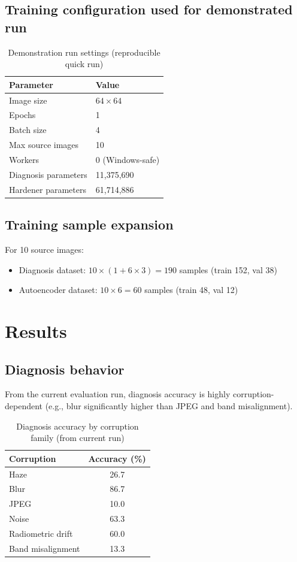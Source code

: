 \documentclass[11pt]{article}
\begin{document}
\subsection{Training configuration used for demonstrated run}
\begin{table}[H]
\centering
\caption{Demonstration run settings (reproducible quick run)}
\begin{tabular}{ll}
\toprule
Parameter & Value \\
\midrule
Image size & $64 \times 64$ \\
Epochs & 1 \\
Batch size & 4 \\
Max source images & 10 \\
Workers & 0 (Windows-safe) \\
Diagnosis parameters & 11,375,690 \\
Hardener parameters & 61,714,886 \\
\bottomrule
\end{tabular}
\label{tab:setup}
\end{table}

\subsection{Training sample expansion}
For 10 source images:
\begin{itemize}
\item Diagnosis dataset: $10 \times (1 + 6\times3) = 190$ samples (train 152, val 38)
\item Autoencoder dataset: $10 \times 6 = 60$ samples (train 48, val 12)
\end{itemize}

\section{Results}
\subsection{Diagnosis behavior}
From the current evaluation run, diagnosis accuracy is highly corruption-dependent (e.g., blur significantly higher than JPEG and band misalignment).

\begin{table}[H]
\centering
\caption{Diagnosis accuracy by corruption family (from current run)}
\begin{tabular}{lc}
\toprule
Corruption & Accuracy (\%) \\
\midrule
Haze & 26.7 \\
Blur & 86.7 \\
JPEG & 10.0 \\
Noise & 63.3 \\
Radiometric drift & 60.0 \\
Band misalignment & 13.3 \\
\bottomrule
\end{tabular}
\label{tab:diag}
\end{table}
\end{document}
